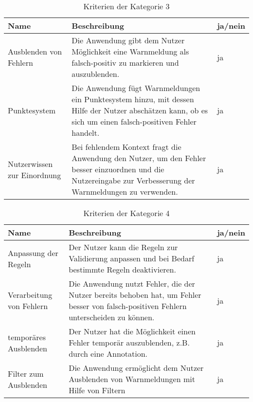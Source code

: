 \begin{table}[htp]
    \centering
    \begin{tabularx}{\columnwidth}{lXl}
        \toprule
        \textbf{Name}               & \textbf{Beschreibung}                                                                                                                                         & \textbf{ja/nein} \\
        \midrule
        Ausblenden von Fehlern      & Die Anwendung gibt dem Nutzer Möglichkeit eine Warnmeldung als falsch-positiv zu markieren und auszublenden.                                                  & ja               \\
        \midrule
        Punktesystem                & Die Anwendung fügt Warnmeldungen ein Punktesystem hinzu, mit dessen Hilfe der Nutzer abschätzen kann, ob es sich um einen falsch-positiven Fehler handelt.    & ja               \\
        \midrule
        Nutzerwissen zur Einordnung & Bei fehlendem Kontext fragt die Anwendung den Nutzer, um den Fehler besser einzuordnen und die Nutzereingabe zur Verbesserung der Warnmeldungen zu verwenden. & ja               \\
        \bottomrule
    \end{tabularx}
    \caption{Kriterien der Kategorie 3}
    \label{tbl:criteria-category-3}
\end{table}


\begin{table}[htp]
    \centering
    \begin{tabularx}{\columnwidth}{lXl}
        \toprule
        \textbf{Name}            & \textbf{Beschreibung}                                                                                                                  & \textbf{ja/nein} \\
        \midrule
        Anpassung der Regeln     & Der Nutzer kann die Regeln zur Validierung anpassen und bei Bedarf bestimmte Regeln deaktivieren.                                      & ja               \\
        \midrule
        Verarbeitung von Fehlern & Die Anwendung nutzt Fehler, die der Nutzer bereits behoben hat, um Fehler besser von falsch-positiven Fehlern unterscheiden zu können. & ja               \\
        \midrule
        temporäres Ausblenden    & Der Nutzer hat die Möglichkeit einen Fehler temporär auszublenden, z.B. durch eine Annotation.                                         & ja               \\
        \midrule
        Filter zum Ausblenden    & Die Anwendung ermöglicht dem Nutzer Ausblenden von Warnmeldungen mit Hilfe von Filtern                                                 & ja               \\
        \bottomrule
    \end{tabularx}
    \caption{Kriterien der Kategorie 4}
    \label{tbl:criteria-category-4}
\end{table}

